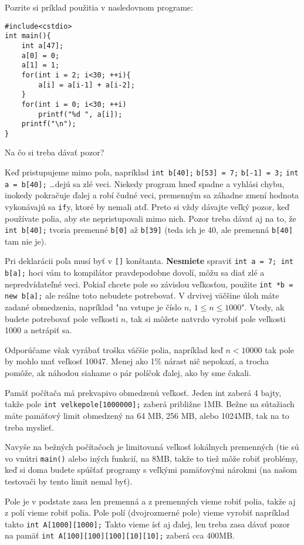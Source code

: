 Pozrite si príklad použitia v nasledovnom programe:
\begin{lstlisting}
#include<cstdio>
int main(){
    int a[47];
    a[0] = 0;
    a[1] = 1;
    for(int i = 2; i<30; ++i){
        a[i] = a[i-1] + a[i-2];
    }
    for(int i = 0; i<30; ++i)
        printf("%d ", a[i]);
    printf("\n");
}
\end{lstlisting}

Na čo si treba dávať pozor?

Keď pristupujeme mimo poľa, napríklad \verb!int b[40];! \verb!b[53] = 7;!
\verb!b[-1] = 3;! \verb!int a = b[40];! \dots dejú sa zlé veci. Niekedy program
hneď spadne a vyhlási chybu, inokedy pokračuje ďalej a robí čudné veci,
premenným sa záhadne zmení hodnota vykonávajú sa \verb!if!y, ktoré by nemali
atď.  Preto si vždy dávajte veľký pozor, keď používate polia, aby ste
nepristupovali mimo nich.  Pozor treba dávať aj na to, že \verb!int b[40];!
tvoria premenné \verb!b[0]! až \verb!b[39]!  (teda ich je 40, ale premenná
\verb!b[40]! tam nie je).

Pri deklarácii poľa musí byť v \verb![]! konštanta.  \textbf{Nesmiete} spraviť
\verb!int a = 7; int b[a];! hoci vám to kompilátor pravdepodobne dovolí, môžu
sa diať zlé a nepredvídateľné veci.  Pokiaľ chcete pole so závislou veľkosťou,
použite \verb!int *b = new b[a];! ale reálne toto nebudete potrebovať. V
drvivej väčšine úloh máte zadané obmedzenia, napríklad "na vstupe je číslo $n$,
$1\leq n\leq 1000$". Vtedy, ak budete potrebovať pole veľkosti $n$, tak si
môžete natvrdo vyrobiť pole veľkosti 1000 a netrápiť sa.

Odporúčame však vyrábať troška väčšie polia, napríklad keď $n<10000$ tak pole
by mohlo mať veľkosť 10047. Menej ako 1\% nárast nič nepokazí, a trocha pomôže,
ak náhodou siahame o pár políčok ďalej, ako by sme čakali. 

Pamäť počítača má prekvapivo obmedzenú veľkosť. Jeden int zaberá 4 bajty, takže
pole \verb!int velkepole[1000000];! zaberá približne 1MB. Bežne na sútažiach
máte pamäťový limit obmedzený na 64 MB, 256 MB, alebo 1024MB, tak na to treba
myslieť.

Navyše na bežných počítačoch je limitovaná veľkosť lokálnych premenných (tie sú
vo vnútri \verb!main()! alebo iných funkcií, na 8MB, takže to tiež môže robiť
problémy, keď si doma budete spúšťať programy s veľkými pamäťovými nárokmi (na
našom testovači by tento limit nemal byť).

\medskip

Pole je v podstate zasa len premenná a z premenných vieme robiť polia, takže aj
z polí vieme robiť polia. Pole polí (dvojrozmerné pole) vieme vyrobiť napríklad
takto \verb!int A[1000][1000];! Takto vieme ísť aj ďalej, len treba zasa dávať
pozor na pamäť \verb!int A[100][100][100][10][10];! zaberá cca 400MB.

